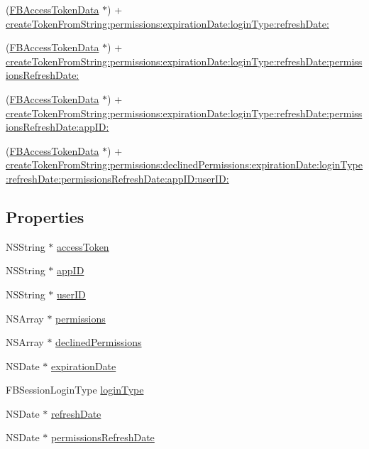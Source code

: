 \begin{DoxyCompactItemize}
\item 
(\hyperlink{interfaceFBAccessTokenData}{F\+B\+Access\+Token\+Data} $\ast$) + \hyperlink{interfaceFBAccessTokenData_af4dd1baa0412b64f5234595a50db223d}{create\+Token\+From\+String\+:permissions\+:expiration\+Date\+:login\+Type\+:refresh\+Date\+:}
\item 
(\hyperlink{interfaceFBAccessTokenData}{F\+B\+Access\+Token\+Data} $\ast$) + \hyperlink{interfaceFBAccessTokenData_ae197e866e84fdbfde1d66b936f0dcc90}{create\+Token\+From\+String\+:permissions\+:expiration\+Date\+:login\+Type\+:refresh\+Date\+:permissions\+Refresh\+Date\+:}
\item 
(\hyperlink{interfaceFBAccessTokenData}{F\+B\+Access\+Token\+Data} $\ast$) + \hyperlink{interfaceFBAccessTokenData_af4e6f1dc14436e143c86c4490c79f4c8}{create\+Token\+From\+String\+:permissions\+:expiration\+Date\+:login\+Type\+:refresh\+Date\+:permissions\+Refresh\+Date\+:app\+I\+D\+:}
\item 
(\hyperlink{interfaceFBAccessTokenData}{F\+B\+Access\+Token\+Data} $\ast$) + \hyperlink{interfaceFBAccessTokenData_a9acd1b715ed1dc4b9c8d7b339eca2ab2}{create\+Token\+From\+String\+:permissions\+:declined\+Permissions\+:expiration\+Date\+:login\+Type\+:refresh\+Date\+:permissions\+Refresh\+Date\+:app\+I\+D\+:user\+I\+D\+:}
\end{DoxyCompactItemize}
\subsection*{Properties}
\begin{DoxyCompactItemize}
\item 
N\+S\+String $\ast$ \hyperlink{interfaceFBAccessTokenData_aa550958def1ed82feed2dd230bce0f6f}{access\+Token}
\item 
N\+S\+String $\ast$ \hyperlink{interfaceFBAccessTokenData_a682373ec99795fc490ec67f8835e3fb4}{app\+ID}
\item 
N\+S\+String $\ast$ \hyperlink{interfaceFBAccessTokenData_a74feacf6915708727dd7cbd6829f517c}{user\+ID}
\item 
N\+S\+Array $\ast$ \hyperlink{interfaceFBAccessTokenData_a30d198f938397de23fa98550615653c4}{permissions}
\item 
N\+S\+Array $\ast$ \hyperlink{interfaceFBAccessTokenData_ab6257dae2bd9ab7eee7b51d3e8a038fd}{declined\+Permissions}
\item 
N\+S\+Date $\ast$ \hyperlink{interfaceFBAccessTokenData_a09f5eec7137020ab953d8a7d3963edf2}{expiration\+Date}
\item 
F\+B\+Session\+Login\+Type \hyperlink{interfaceFBAccessTokenData_a79c3bd0ea65ee9fcd7ab96760ce5724d}{login\+Type}
\item 
N\+S\+Date $\ast$ \hyperlink{interfaceFBAccessTokenData_aa1242caf2fc0cee3e0ed812bab19df38}{refresh\+Date}
\item 
N\+S\+Date $\ast$ \hyperlink{interfaceFBAccessTokenData_a1bd0d79054cc339cf65e965be66b007b}{permissions\+Refresh\+Date}
\end{DoxyCompactItemize}


